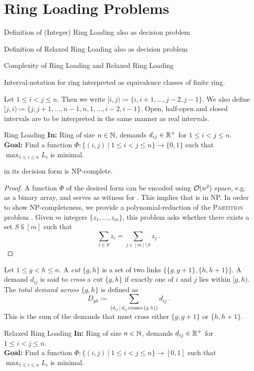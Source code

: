 \section{Ring Loading Problems}

Definition of (Integer) Ring Loading also as decision problem

Definition of Relaxed Ring Loading also as decision problem

Complexity of Ring Loading and Relaxed Ring Loading

Interval-notation for ring interpreted as equivalence classes of finite ring.

\begin{notation}
	Let $1 \leq i < j \leq n$.
	Then we write $[i, j) \coloneqq \{i, i+1, \ldots, j-2, j-1\}$.
	We also define $[j, i) \coloneqq \{j, j+1, \ldots, n-1, n, 1, \ldots, i-2, i-1\}$.
	Open, half-open and closed intervals are to be interpreted in the same manner as real intervals.
\end{notation}

\begin{problem}{Ring Loading}
	\textbf{In:} Ring of size $n \in \mathbb{N}$, demands $d_{ij} \in \mathbb{R}^+$ for $1 \leq i < j \leq n$.\\
	\textbf{Goal:} Find a function $\Phi: \{(i, j)~|~1 \leq i < j \leq n\} \rightarrow \{0, 1\}$ such that
	$\max_{1 \leq i \leq n} L_i$ is minimal.
\end{problem}

\begin{theorem}
	\RL in its decision form is NP-complete.
\end{theorem}
\begin{proof}
	A function $\Phi$ of the desired form can be encoded using $\mathcal{O}(n^2)$ space, e.g. as a binary array, and serves as witness for \RL.
	This implies that \RL is in NP.
	In order to show NP-completeness, we provide a polynomial-reduction of the \textsc{Partition} problem \cite{karp72}.
	Given $m$ integers $\{z_1, \ldots, z_m\}$, this problem asks whether there exists a set $S \subseteqq [m]$ such that 
	\begin{equation}
		\sum_{i \in S} z_i = \sum_{j \in [m] \setminus S} z_j \ .
	\end{equation}
	
\end{proof}

\begin{definition}
	Let $1 \leq g < h \leq n$.
	A \emph{cut} $\{g, h\}$ is a set of two links $\{\{g, g+1\}, \{h, h+1\}\}$.
	A demand $d_{ij}$ is said to \emph{cross} a cut $\{g, h\}$ if exactly one of $i$ and $j$ lies within $[g, h)$.
	The \emph{total demand across $\{g, h\}$} is defined as
	\begin{equation}
		D_{gh} \coloneqq \sum_{\{d_{ij}~|~d_{ij}\ \text{crosses}\ \{g, h\}\}} d_{ij} \ .
	\end{equation}
	This is the sum of the demands that must cross either $\{g, g+1\}$ or $\{h, h+1\}$.
\end{definition}

\begin{problem}{Relaxed Ring Loading}
	\textbf{In:} Ring of size $n \in \mathbb{N}$, demands $d_{ij} \in \mathbb{R}^+$ for $1 \leq i < j \leq n$.\\
		\textbf{Goal:} Find a function $\Phi: \{(i, j)~|~1 \leq i < j \leq n\} \rightarrow [0, 1]$ such that $\max_{1 \leq i \leq n} L_i$ is minimal.
\end{problem}